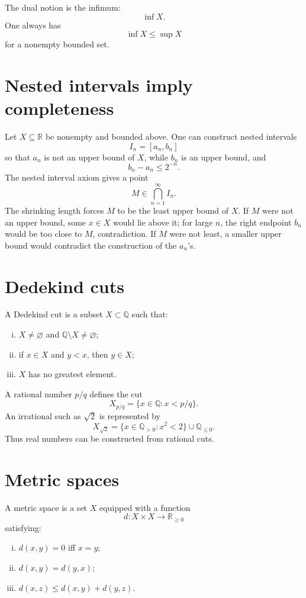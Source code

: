 The dual notion is the infimum:
\[
  \inf X.
\]
One always has
\[
  \inf X\le \sup X
\]
for a nonempty bounded set.

\section{Nested intervals imply completeness}

Let \(X\subseteq\mathbb R\) be nonempty and bounded above.  One can construct nested intervals
\[
  I_n=[a_n,b_n]
\]
so that \(a_n\) is not an upper bound of \(X\), while \(b_n\) is an upper bound, and
\[
  b_n-a_n\le 2^{-n}.
\]
The nested interval axiom gives a point
\[
  M\in\bigcap_{n=1}^{\infty}I_n.
\]
The shrinking length forces \(M\) to be the least upper bound of \(X\).  If \(M\) were not an upper bound, some \(x\in X\) would lie above it; for large \(n\), the right endpoint \(b_n\) would be too close to \(M\), contradiction.  If \(M\) were not least, a smaller upper bound would contradict the construction of the \(a_n\)'s.

\section{Dedekind cuts}

A Dedekind cut is a subset \(X\subset\mathbb Q\) such that:
\begin{enumerate}[(i)]
  \item \(X\neq\varnothing\) and \(\mathbb Q\setminus X\neq\varnothing\);
  \item if \(x\in X\) and \(y<x\), then \(y\in X\);
  \item \(X\) has no greatest element.
\end{enumerate}
A rational number \(p/q\) defines the cut
\[
  X_{p/q}=\{x\in\mathbb Q:x<p/q\}.
\]
An irrational such as \(\sqrt2\) is represented by
\[
  X_{\sqrt2}=\{x\in\mathbb Q_{>0}:x^2<2\}\cup\mathbb Q_{\le0}.
\]
Thus real numbers can be constructed from rational cuts.

\section{Metric spaces}

A metric space is a set \(X\) equipped with a function
\[
  d:X\times X\to\mathbb R_{\ge0}
\]
satisfying:
\begin{enumerate}[(i)]
  \item \(d(x,y)=0\) iff \(x=y\);
  \item \(d(x,y)=d(y,x)\);
  \item \(d(x,z)\le d(x,y)+d(y,z)\).
\end{enumerate}

